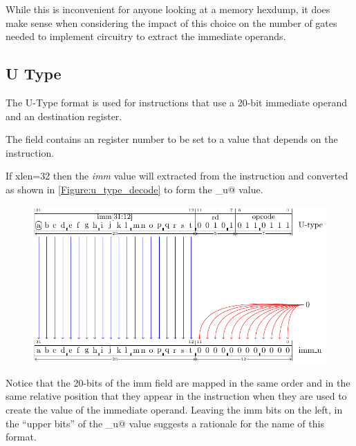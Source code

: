 While this is inconvenient for anyone looking at a memory hexdump, it does
make sense when considering the impact of this choice on the number of
gates needed to implement circuitry to extract the immediate operands.

\subsection{U Type}
\label{insnformat:utype}

The U-Type format is used for instructions that use a 20-bit immediate operand
and an \verb@rd@ destination register.


The  field contains an  register number to be set to a value that
depends on the instruction.


If \Gls{xlen}=32 then the {\em imm} value will extracted from the instruction
and converted as shown in \autoref{Figure:u_type_decode} to form the
\verb@imm_u@ value.

\begin{figure}[ht]
  \centering
  \includegraphics{figures/chapter05/UTypeDecode.pdf}
  \label{Figure:u_type_decode}
  \label{imm.u:decode}
\end{figure}

Notice that the 20-bits of the imm field are mapped in the same order and
in the same relative position that they appear in the instruction when
they are used to create the value of the immediate operand.
Leaving the imm bits on the left, in the ``upper bits'' of the \verb@imm_u@
value suggests a rationale for the name of this format.

